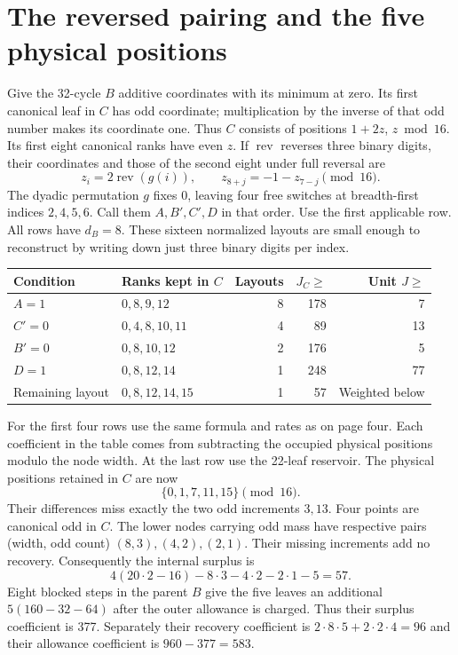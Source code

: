 \documentclass[12pt,letterpaper]{article}
\newcommand{\pagepart}[1]{\clearpage\section{#1}}
\begin{document}
\pagepart{The reversed pairing and the five physical positions}
Give the 32-cycle \(B\) additive coordinates with its minimum at zero. Its first canonical leaf in \(C\) has odd coordinate; multiplication by the inverse of that odd number makes its coordinate one. Thus \(C\) consists of positions \(1+2z\), \(z\bmod16\). Its first eight canonical ranks have even \(z\). If \(\operatorname{rev}\) reverses three binary digits, their coordinates and those of the second eight under full reversal are
\[
 z_i=2\operatorname{rev}(g(i)),\qquad
 z_{8+j}=-1-z_{7-j}\pmod{16}.
\]
The dyadic permutation \(g\) fixes 0, leaving four free switches at breadth-first indices \(2,4,5,6\). Call them \(A,B',C',D\) in that order. Use the first applicable row. All rows have \(d_B=8\). These sixteen normalized layouts are small enough to reconstruct by writing down just three binary digits per index.
\begin{center}\begin{tabular}{@{}llrrr@{}}\toprule
Condition & Ranks kept in \(C\) & Layouts & \(J_C\ge\) & Unit \(J\ge\)\\\midrule
\(A=1\) & \(0,8,9,12\) & 8 & 178 & 7\\
\(C'=0\) & \(0,4,8,10,11\) & 4 & 89 & 13\\
\(B'=0\) & \(0,8,10,12\) & 2 & 176 & 5\\
\(D=1\) & \(0,8,12,14\) & 1 & 248 & 77\\
Remaining layout & \(0,8,12,14,15\) & 1 & 57 & Weighted below\\\bottomrule
\end{tabular}\end{center}
For the first four rows use the same formula and rates as on page four. Each coefficient in the table comes from subtracting the occupied physical positions modulo the node width. At the last row use the 22-leaf reservoir. The physical positions retained in \(C\) are now
\[
                            \{0,1,7,11,15\}\pmod {16}.
\]
Their differences miss exactly the two odd increments \(3,13\). Four points are canonical odd in \(C\). The lower nodes carrying odd mass have respective pairs (width, odd count) \((8,3),(4,2),(2,1)\). Their missing increments add no recovery. Consequently the internal surplus is
\[
 4(20\cdot2-16)-8\cdot3-4\cdot2-2\cdot1-5=57.
\]
Eight blocked steps in the parent \(B\) give the five leaves an additional \(5(160-32-64)\) after the outer allowance is charged. Thus their surplus coefficient is 377. Separately their recovery coefficient is \(2\cdot8\cdot5+2\cdot2\cdot4=96\) and their allowance coefficient is \(960-377=583\).
\end{document}
